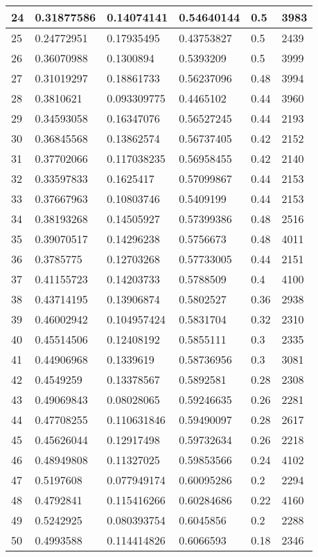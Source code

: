 \begin{longtable}{|l|l|l|l|l|l|}
24 & 0.31877586 & 0.14074141 & 0.54640144 & 0.5 & 3983 \\ \hline 
25 & 0.24772951 & 0.17935495 & 0.43753827 & 0.5 & 2439 \\ \hline 
26 & 0.36070988 & 0.1300894 & 0.5393209 & 0.5 & 3999 \\ \hline 
27 & 0.31019297 & 0.18861733 & 0.56237096 & 0.48 & 3994 \\ \hline 
28 & 0.3810621 & 0.093309775 & 0.4465102 & 0.44 & 3960 \\ \hline 
29 & 0.34593058 & 0.16347076 & 0.56527245 & 0.44 & 2193 \\ \hline 
30 & 0.36845568 & 0.13862574 & 0.56737405 & 0.42 & 2152 \\ \hline 
31 & 0.37702066 & 0.117038235 & 0.56958455 & 0.42 & 2140 \\ \hline 
32 & 0.33597833 & 0.1625417 & 0.57099867 & 0.44 & 2153 \\ \hline 
33 & 0.37667963 & 0.10803746 & 0.5409199 & 0.44 & 2153 \\ \hline 
34 & 0.38193268 & 0.14505927 & 0.57399386 & 0.48 & 2516 \\ \hline 
35 & 0.39070517 & 0.14296238 & 0.5756673 & 0.48 & 4011 \\ \hline 
36 & 0.3785775 & 0.12703268 & 0.57733005 & 0.44 & 2151 \\ \hline 
37 & 0.41155723 & 0.14203733 & 0.5788509 & 0.4 & 4100 \\ \hline 
38 & 0.43714195 & 0.13906874 & 0.5802527 & 0.36 & 2938 \\ \hline 
39 & 0.46002942 & 0.104957424 & 0.5831704 & 0.32 & 2310 \\ \hline 
40 & 0.45514506 & 0.12408192 & 0.5855111 & 0.3 & 2335 \\ \hline 
41 & 0.44906968 & 0.1339619 & 0.58736956 & 0.3 & 3081 \\ \hline 
42 & 0.4549259 & 0.13378567 & 0.5892581 & 0.28 & 2308 \\ \hline 
43 & 0.49069843 & 0.08028065 & 0.59246635 & 0.26 & 2281 \\ \hline 
44 & 0.47708255 & 0.110631846 & 0.59490097 & 0.28 & 2617 \\ \hline 
45 & 0.45626044 & 0.12917498 & 0.59732634 & 0.26 & 2218 \\ \hline 
46 & 0.48949808 & 0.11327025 & 0.59853566 & 0.24 & 4102 \\ \hline 
47 & 0.5197608 & 0.077949174 & 0.60095286 & 0.2 & 2294 \\ \hline 
48 & 0.4792841 & 0.115416266 & 0.60284686 & 0.22 & 4160 \\ \hline 
49 & 0.5242925 & 0.080393754 & 0.6045856 & 0.2 & 2288 \\ \hline 
50 & 0.4993588 & 0.114414826 & 0.6066593 & 0.18 & 2346 \\ \hline 
\end{longtable}